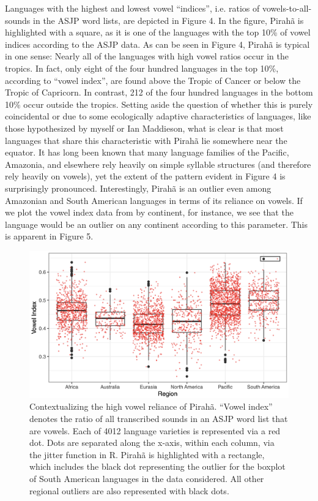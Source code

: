 \documentclass[output=paper,colorlinks,citecolor=brown
]{langscibook}
\begin{document}
    Languages with the highest and lowest vowel “indices”, i.e. ratios of vowels-to-all-sounds in the ASJP word lists, are depicted in Figure 4. In the figure, Pirahã is highlighted with a square, as it is one of the languages with the top 10\% of vowel indices according to the ASJP data. As can be seen in Figure 4, Pirahã is typical in one sense: Nearly all of the languages with high vowel ratios occur in the tropics. In fact, only eight of the four hundred languages in the top 10\%, according to “vowel index”, are found above the Tropic of Cancer or below the Tropic of Capricorn. In contrast, 212 of the four hundred languages in the bottom 10\% occur outside the tropics. Setting aside the question of whether this is purely coincidental or due to some ecologically adaptive characteristics of languages, like those hypothesized by myself or Ian Maddieson, what is clear is that most languages that share this characteristic with Pirahã lie somewhere near the equator. It has long been known that many language families of the Pacific, Amazonia, and elsewhere rely heavily on simple syllable structures (and therefore rely heavily on vowels), yet the extent of the pattern evident in Figure 4 is surprisingly pronounced. Interestingly, Pirahã is an outlier even among Amazonian and South American languages in terms of its reliance on vowels. If we plot the vowel index data from  by continent, for instance, we see that the language would be an outlier on any continent according to this parameter. This is apparent in Figure 5.

\begin{figure}
\centering
\includegraphics[width=1\textwidth]{figures/everett_figure5.png}
\caption{\label{fig:Figure 5}Contextualizing the high vowel reliance of Pirahã. “Vowel index” denotes the ratio of all transcribed sounds in an ASJP word list that are vowels. Each of 4012 language varieties is represented via a red dot. Dots are separated along the x-axis, within each column, via the jitter function in R. Pirahã is highlighted with a rectangle, which includes the black dot representing the outlier for the boxplot of South American languages in the data considered. All other regional outliers are also represented with black dots.
}

\end{figure}
\end{document}
